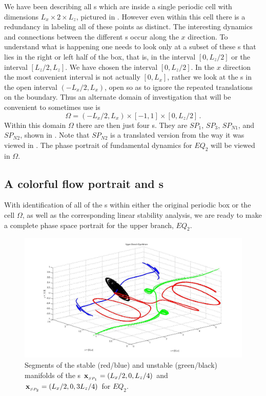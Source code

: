 \documentclass[lineno]{jfm}
\begin{document}
We have been describing all \stagp s which are inside a single periodic 
cell with dimensions $L_x \times 2 \times L_z$, pictured in 
. However even within this cell there is a 
redundancy in labeling all of these points as distinct. The interesting 
dynamics and connections between the different \stagp s occur along the 
$x$ direction. To understand what is happening one needs to look only at 
a subset of these \stagp s that lies in the right or left half of the 
box, that is, in the interval $[0,L_{z}/2]$ or the interval 
$[L_{z}/2,L_{z}]$. We have chosen the interval $[0,L_{z}/2]$. In the $x$ 
direction the most convenient interval is not actually $[0,L_{x}]$, 
rather we look at the \stagp s in the open interval $(-L_{x}/2,L_{x})$, 
open so as to ignore the repeated translations on the boundary. Thus an 
alternate domain of investigation that will be convenient to sometimes 
use is 
\[ %
\Omega = (-L_{x}/2,L_{x}) \times [-1,1] \times [0,L_{z}/2]
\,. 
\] %
Within this domain $\Omega$ there are then just four \stagp s. They 
are $SP_1$, $SP_3$, $SP_{N1}$, and $SP_{N2}$, shown in 
. Note that $SP_{N2}$ is a translated 
version from the way it was viewed in . The 
phase portrait of fundamental dynamics for $EQ_2$ will be viewed in 
$\Omega$.


\subsection{A colorful flow portrait and {\hc}s}

With identification of all of the {\stagp}s within either the original 
periodic box or the cell $\Omega$, as well as the corresponding linear 
stability analysis, we are ready to make a complete phase space portrait 
for the upper branch, $EQ_2$.

\begin{figure}[!h]
\includegraphics[width=1.0\textwidth]{manifolds_both.jpg}
  \caption{
   Segments of the stable (red/blue) and unstable (green/black) manifolds of the \stagp s
   $\bold{x}_{_{SP_{1}}} = (L_x/2,0,L_z/4)$ and
   $\bold{x}_{_{SP_{2}}} = (L_x/2,0,3L_z/4)$ for $EQ_2$. 
   }
  \label{fig:manifolds_both}
 \end{figure}
\end{document}
